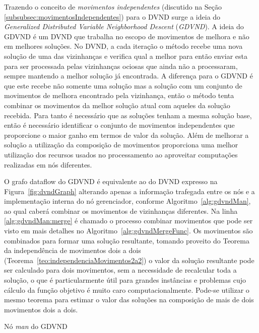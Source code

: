 Trazendo o conceito de \textit{movimentos independentes} (discutido na Seção \ref{subsubsec:movimentosIndependentes}) para o DVND surge a ideia do \emph{Generalized Distributed Variable Neighborhood Descent} (\emph{GDVND}).
A ideia do GDVND é um DVND que trabalha no escopo de movimentos de melhora e não em melhores soluções.
No DVND, a cada iteração o método recebe uma nova solução de uma das vizinhanças e verifica qual a melhor para então enviar esta para ser processada pelas vizinhanças ociosas que ainda não a processaram, sempre mantendo a melhor solução já encontrada.
A diferença para o GDVND é que este recebe não somente uma solução mas a solução com um conjunto de movimentos de melhora encontrado pela vizinhança, então o método tenta combinar os movimentos da melhor solução atual com aqueles da solução recebida.
Para tanto é necessário que as soluções tenham a mesma solução base, então é necessário identificar o conjunto de movimentos independentes que proporcione o maior ganho em termos de valor da solução.
Além de melhorar a solução a utilização da composição de movimentos proporciona uma melhor utilização dos recursos usados no processamento ao aproveitar computações realizadas em nós diferentes.

O grafo dataflow do GDVND é equivalente ao do DVND expresso na Figura~\ref{fig:dvndGraph} alterando apenas a informação trafegada entre os nós e a implementação interna do nó gerenciador, conforme Algoritmo~\ref{alg:gdvndMan}, ao qual caberá combinar os movimentos de vizinhanças diferentes.
Na linha \ref{alg:gdvndMan:merge} é chamado o processo combinar movimentos que pode ser visto em mais detalhes no Algoritmo~\ref{alg:gdvndMergeFunc}.
Os movimentos são combinados para formar uma solução resultante, tomando proveito do Teorema da independência de movimentos dois a dois (Teorema~\ref{teo:independenciaMovimentos2a2}) o valor da solução resultante pode ser calculado para dois movimentos, sem a necessidade de recalcular toda a solução, o que é particularmente útil para grandes instâncias e problemas cujo cálculo da função objetivo é muito caro computacionalmente.
Pode-se utilizar o mesmo teorema para estimar o valor das soluções na composição de mais de dois movimentos dois a dois.

\begin{algorithm}[htpb]
\caption{Nó \textit{man} do GDVND}
\label{alg:gdvndMan}
\begin{algorithmic}[1]
         \label{alg:gdvndMan:merge} 
         
    \EndFunction
\end{algorithmic}
\end{algorithm}

